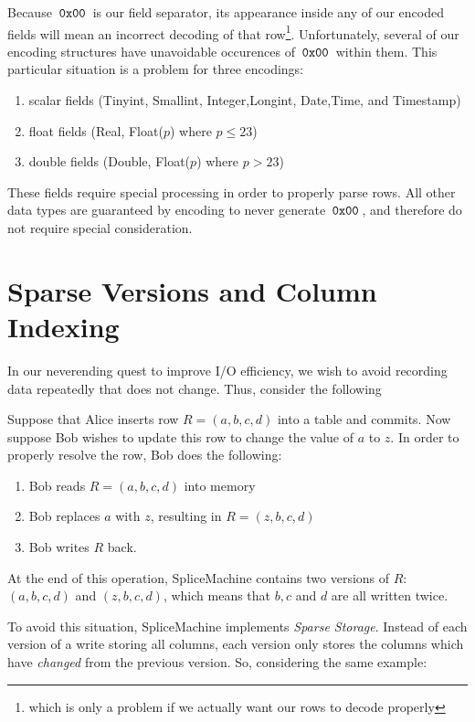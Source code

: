 Because $\,\texttt{0x00}\,$ is our field separator, its appearance inside any of our encoded fields will mean an incorrect decoding of that row\footnote{which is only a problem if we actually want our rows to decode properly}. Unfortunately, several of our encoding structures have unavoidable occurences of $\,\texttt{0x00}\,$ within them. This particular situation is a problem for three encodings:

\begin{enumerate}
				\item scalar fields (Tinyint, Smallint, Integer,Longint, Date,Time, and Timestamp)
				\item float fields (Real, Float($p$) where $p\leq23$)
				\item double fields (Double, Float($p$) where $p > 23$)
\end{enumerate}

These fields require special processing in order to properly parse rows. All other data types are guaranteed by encoding to never generate $\,\texttt{0x00}\,$, and therefore do not require special consideration.

\section{Sparse Versions and Column Indexing}
In our neverending quest to improve I/O efficiency, we wish to avoid recording data repeatedly that does not change. Thus, consider the following

\begin{exmp}
				Suppose that Alice inserts row $R = (a,b,c,d)$ into a table and commits. Now suppose Bob wishes to update this row to change the value of $a$ to $z$. In order to properly resolve the row, Bob does the following:

				\begin{enumerate}
								\item Bob reads $R = (a,b,c,d)$ into memory
								\item Bob replaces $a$ with $z$, resulting in $R = (z,b,c,d)$
								\item Bob writes $R$ back.
				\end{enumerate}
				At the end of this operation, SpliceMachine contains two versions of $R$: $(a,b,c,d)$ and $(z,b,c,d)$, which means that $b,c$ and $d$ are all written twice.
\end{exmp}

To avoid this situation, SpliceMachine implements \emph{Sparse Storage}. Instead of each version of a write storing all columns, each version only stores the columns which have \emph{changed} from the previous version. So, considering the same example:

